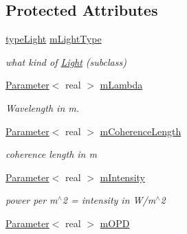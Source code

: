 \subsection*{Protected Attributes}
\begin{DoxyCompactItemize}
\item 
\hyperlink{light_8h_a6dc57eac1ae8b19466de554123d5c6c3}{type\+Light} \hyperlink{classLight_aee4380e879fac1a8687c8dc4a8401d8d}{m\+Light\+Type}\hypertarget{classLight_aee4380e879fac1a8687c8dc4a8401d8d}{}\label{classLight_aee4380e879fac1a8687c8dc4a8401d8d}

\begin{DoxyCompactList}\small\item\em what kind of \hyperlink{classLight}{Light} (subclass) \end{DoxyCompactList}\item 
\hyperlink{classParameter}{Parameter}$<$ real $>$ \hyperlink{classLight_a6bcf65e42bbe7525e704edd9b22892f8}{m\+Lambda}\hypertarget{classLight_a6bcf65e42bbe7525e704edd9b22892f8}{}\label{classLight_a6bcf65e42bbe7525e704edd9b22892f8}

\begin{DoxyCompactList}\small\item\em Wavelength in m. \end{DoxyCompactList}\item 
\hyperlink{classParameter}{Parameter}$<$ real $>$ \hyperlink{classLight_a67e9a5774841ce868a7cf5b9312c6850}{m\+Coherence\+Length}\hypertarget{classLight_a67e9a5774841ce868a7cf5b9312c6850}{}\label{classLight_a67e9a5774841ce868a7cf5b9312c6850}

\begin{DoxyCompactList}\small\item\em coherence length in m \end{DoxyCompactList}\item 
\hyperlink{classParameter}{Parameter}$<$ real $>$ \hyperlink{classLight_accb9c61fcc083de4cd5a33e02347712b}{m\+Intensity}\hypertarget{classLight_accb9c61fcc083de4cd5a33e02347712b}{}\label{classLight_accb9c61fcc083de4cd5a33e02347712b}

\begin{DoxyCompactList}\small\item\em power per m$^\wedge$2 = intensity in W/m$^\wedge$2 \end{DoxyCompactList}\item 
\hyperlink{classParameter}{Parameter}$<$ real $>$ \hyperlink{classLight_a6de046378d4fa3eac06bf4cb3549e95e}{m\+O\+PD}\hypertarget{classLight_a6de046378d4fa3eac06bf4cb3549e95e}{}\label{classLight_a6de046378d4fa3eac06bf4cb3549e95e}


\end{DoxyCompactItemize}
